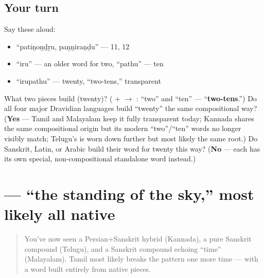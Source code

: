 \subsection*{Your turn}
Say these aloud:

\begin{itemize}
\raggedright
  \item \textquotedblleft{}patiṉoṉḏṟu, paṉṉiraṇḍu\textquotedblright{} — 11, 12
  \item \textquotedblleft{}iru\textquotedblright{} — an older word for two, \textquotedblleft{}pathu\textquotedblright{} — ten
  \item \textquotedblleft{}irupathu\textquotedblright{} — twenty, \textquotedblleft{}two-tens,\textquotedblright{} transparent
\end{itemize}

\begin{tcolorbox}[breakable,colback=teal!4,colframe=teal!35!black,title={Before you move on}]
What two pieces build \textbf{} (twenty)? (\textbf{} + \textbf{} $\to$ \textbf{}: \textquotedblleft{}two\textquotedblright{} and \textquotedblleft{}ten\textquotedblright{} — \textquotedblleft{}\textbf{two-tens}.\textquotedblright{}) Do all four major Dravidian languages build \textquotedblleft{}twenty\textquotedblright{} the same compositional way? (\textbf{Yes} — Tamil and Malayalam keep it fully transparent today; Kannada shares the same compositional origin but its modern \textquotedblleft{}two\textquotedblright{}/\textquotedblleft{}ten\textquotedblright{} words no longer visibly match; Telugu's is worn down further but most likely the same root.) Do Sanskrit, Latin, or Arabic build their word for twenty this way? (\textbf{No} — each has its own special, non-compositional standalone word instead.)
\end{tcolorbox}
\section[\texorpdfstring{\ta{வானிலை} (vāṉilai)}{வானிலை (vāṉilai)}]{ — \textquotedblleft{}the standing of the sky,\textquotedblright{} most likely all native}

\label{lesson:TA-C20-vaanilai}



\begin{quote}
You've now seen a Persian+Sanskrit hybrid (Kannada), a pure Sanskrit compound (Telugu), and a Sanskrit compound echoing \textquotedblleft{}time\textquotedblright{} (Malayalam). Tamil most likely breaks the pattern one more time — with a word built entirely from native pieces.
\end{quote}


